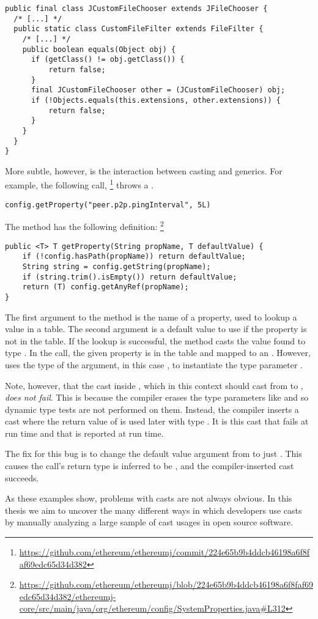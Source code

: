 \begin{verbatim}
public final class JCustomFileChooser extends JFileChooser {
  /* [...] */
  public static class CustomFileFilter extends FileFilter {
    /* [...] */
    public boolean equals(Object obj) {
      if (getClass() != obj.getClass()) {
          return false;
      }
      final JCustomFileChooser other = (JCustomFileChooser) obj;
      if (!Objects.equals(this.extensions, other.extensions)) {
          return false;
      }
    }
  }
}
\end{verbatim} 

More subtle, however, is the interaction between casting and generics.
For example, the following call,%
\footnote{\url{https://github.com/ethereum/ethereumj/commit/224e65b9b4ddcb46198a6f8faf69edc65d34d382}}
throws a .

\begin{verbatim}
config.getProperty("peer.p2p.pingInterval", 5L)
\end{verbatim}

The method has the following definition:%
\footnote{\url{https://github.com/ethereum/ethereumj/blob/224e65b9b4ddcb46198a6f8faf69edc65d34d382/ethereumj-core/src/main/java/org/ethereum/config/SystemProperties.java\#L312}}
\begin{verbatim}
public <T> T getProperty(String propName, T defaultValue) {
    if (!config.hasPath(propName)) return defaultValue;
    String string = config.getString(propName);
    if (string.trim().isEmpty()) return defaultValue;
    return (T) config.getAnyRef(propName);
}
\end{verbatim}
The first argument to the method is the name of a property, used to lookup a
value in a table. The second argument is a default value to use if the
property is not in the table. If the lookup is successful, the method casts
the value found to type .
In the call, the given property
 is in the table and mapped to an .
However, \java{} uses the type of the  argument, in this
case , to instantiate the type parameter .

Note, however, that the cast inside , which in this context
should cast from  to , \emph{does not fail}.
This is because the \java{} compiler erases the type
parameters like  and so dynamic type tests are not performed on them.
Instead, the compiler inserts a cast where the return value
of  is used later with type .
It is this cast that fails at run time and that is reported at run time.

The fix for this bug is to change the default value argument from 
to just . This causes the call's return type is inferred to be
, and the compiler-inserted cast succeeds.

As these examples show, problems with casts are not always obvious.
In this thesis we aim to uncover the many different ways in which developers use casts
by manually analyzing a large sample of cast usages in open source software.